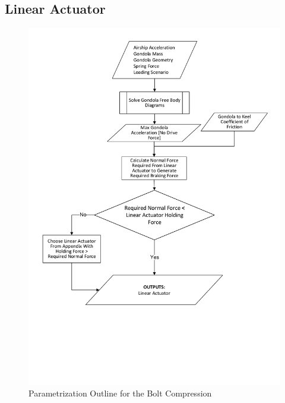 \documentclass[../main.tex]{subfiles}
\begin{document}
\subsection{Linear Actuator} 
\begin{figure}[H]
	\centering
	\includegraphics[width=\linewidth]{img/paramaterization/linearActuator.pdf}
	\caption{Parametrization Outline for the Bolt Compression}
	\label{fig:linearActuatorParametrization}
\end{figure}
\end{document}
